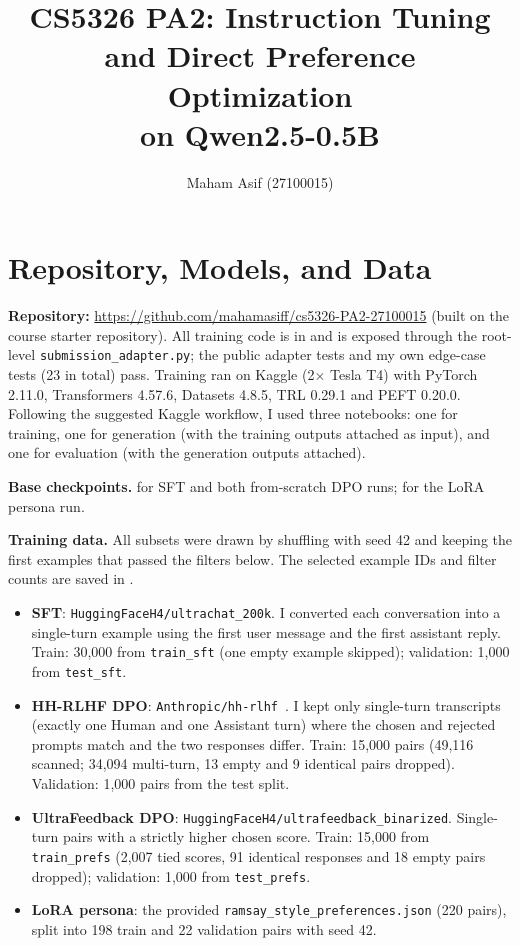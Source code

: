 \documentclass[10pt]{article}
\title{\vspace{-1.5em}CS5326 PA2: Instruction Tuning and Direct Preference Optimization\\on Qwen2.5-0.5B\vspace{-0.5em}}
\author{Maham Asif (27100015)}
\date{\vspace{-1em}}
\begin{document}
\maketitle
\vspace{-1em}

\section{Repository, Models, and Data}

\textbf{Repository:} \url{https://github.com/mahamasiff/cs5326-PA2-27100015} (built on the course starter repository).
All training code is in  and is exposed through the root-level \texttt{submission\_adapter.py}; the public adapter tests and my own edge-case tests (23 in total) pass.
Training ran on Kaggle (2$\times$ Tesla T4) with PyTorch 2.11.0, Transformers 4.57.6, Datasets 4.8.5, TRL 0.29.1 and PEFT 0.20.0.
Following the suggested Kaggle workflow, I used three notebooks: one for training, one for generation (with the training outputs attached as input), and one for evaluation (with the generation outputs attached).

\textbf{Base checkpoints.}  for SFT and both from-scratch DPO runs;  for the LoRA persona run.

\textbf{Training data.} All subsets were drawn by shuffling with seed 42 and keeping the first examples that passed the filters below. The selected example IDs and filter counts are saved in .
\begin{itemize}
  \item \textbf{SFT}: \texttt{HuggingFaceH4/ultrachat\_200k}. I converted each conversation into a single-turn example using the first user message and the first assistant reply. Train: 30,000 from \texttt{train\_sft} (one empty example skipped); validation: 1,000 from \texttt{test\_sft}.
  \item \textbf{HH-RLHF DPO}: \texttt{Anthropic/hh-rlhf}~\cite{bai2022}. I kept only single-turn transcripts (exactly one Human and one Assistant turn) where the chosen and rejected prompts match and the two responses differ. Train: 15,000 pairs (49,116 scanned; 34,094 multi-turn, 13 empty and 9 identical pairs dropped). Validation: 1,000 pairs from the test split.
  \item \textbf{UltraFeedback DPO}: \texttt{HuggingFaceH4/ultrafeedback\_binarized}. Single-turn pairs with a strictly higher chosen score. Train: 15,000 from \texttt{train\_prefs} (2,007 tied scores, 91 identical responses and 18 empty pairs dropped); validation: 1,000 from \texttt{test\_prefs}.
  \item \textbf{LoRA persona}: the provided \texttt{ramsay\_style\_preferences.json} (220 pairs), split into 198 train and 22 validation pairs with seed 42.
\end{itemize}
\end{document}
